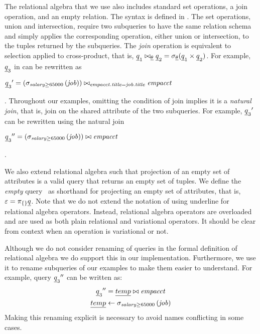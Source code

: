 

The relational algebra that we use also includes standard set operations, a join 
operation, and an empty relation. The syntax is defined in .
%
The set operations, union and intersection, require two subqueries to have the same relation schema
and simply applies the corresponding operation, either union or intersection, to the tuples returned by
the subqueries.
%
The \emph{join} operation is equivalent to selection applied to cross-product, that is,
$\pQ_1 \bowtie_{\pCond} \pQ_2 = \vSel [\pCond] {(\pQ_1 \times \pQ_2)}$.
For example, ${\pQ_3}$ in  can be rewritten as\\
\centerline{
\ensuremath{
\VVal {{\pQ_3}} = \left(\sigma_{\salary \ge 65000} \left(\job\right)\right) \bowtie_{\empacct.\titleatt=\job.\titleatt} \empacct
}}.
\noindent
Throughout our examples, omitting the condition of join  implies it is a \emph{natural join},
that is, join on the shared attribute of the two subqueries.
For example, $\VVal {{\pQ_3}}$ can be rewritten using the natural join\\
\centerline{
\ensuremath{
\VVVal {{\pQ_3}} =  \left(\sigma_{\salary \ge 65000} \left(\job\right)\right) \bowtie \empacct
}}.



We also extend relational algebra such that projection of an empty set of
attributes is a valid query that returns an empty set of tuples. We define the
\emph{empty} query \empPRel\ as shorthand for projecting an empty set of
attributes, that is, $\empPRel = \pi_{\{\}} \pQ$.
%
Note that we do not extend the notation of using underline for relational algebra
operators. Instead, relational algebra operators are overloaded and are used
as both plain relational and variational operators. It should be clear from
context when an operation is variational or not. 


Although we do not consider renaming of queries in the formal definition of 
relational algebra we do support this in our implementation. Furthermore, we use it
to rename subqueries of our examples to make them easier to understand. 
For example, query $\VVVal {{\pQ_3}}$ can be written as:
\begin{align*}
\VVVal {{\pQ_3}} &= \underline{temp} \bowtie \empacct\\
\underline{temp} &\leftarrow  \sigma_{\salary \ge 65000} \left(\job\right)
\end{align*}
\noindent
Making this renaming explicit is necessary to avoid names conflicting in some cases.




